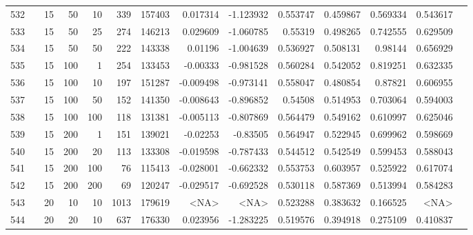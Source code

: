 \begin{longtable}{llrrrrrrrrrrrr}
		532 & &           15 &                50 &           10 &         339 &     157403 &  0.017314 & -1.123932 &  0.553747 &    0.459867 &       0.569334 &  0.543617 \\
		533 & &           15 &                50 &           25 &         274 &     146213 &  0.029609 & -1.060785 &   0.55319 &    0.498265 &       0.742555 &  0.629509 \\
		534 & &           15 &                50 &           50 &         222 &     143338 &   0.01196 & -1.004639 &  0.536927 &    0.508131 &        0.98144 &  0.656929 \\
		535 & &           15 &               100 &            1 &         254 &     133453 &  -0.00333 & -0.981528 &  0.560284 &    0.542052 &       0.819251 &  0.632335 \\
		536 & &           15 &               100 &           10 &         197 &     151287 & -0.009498 & -0.973141 &  0.558047 &    0.480854 &        0.87821 &  0.606955 \\
		537 & &           15 &               100 &           50 &         152 &     141350 & -0.008643 & -0.896852 &   0.54508 &    0.514953 &       0.703064 &  0.594003 \\
		538 & &           15 &               100 &          100 &         118 &     131381 & -0.005113 & -0.807869 &  0.564479 &    0.549162 &       0.610997 &  0.625046 \\
		539 & &           15 &               200 &            1 &         151 &     139021 &  -0.02253 &  -0.83505 &  0.564947 &    0.522945 &       0.699962 &  0.598669 \\
		540 & &           15 &               200 &           20 &         113 &     133308 & -0.019598 & -0.787433 &  0.544512 &    0.542549 &       0.599453 &  0.588043 \\
		541 & &           15 &               200 &          100 &          76 &     115413 & -0.028001 & -0.662332 &  0.553753 &    0.603957 &       0.525922 &  0.617074 \\
		542 & &           15 &               200 &          200 &          69 &     120247 & -0.029517 & -0.692528 &  0.530118 &    0.587369 &       0.513994 &  0.584283 \\
		543 & &           20 &                10 &           10 &           1013 &     179619 &      <NA> &      <NA> &  0.523288 &    0.383632 &       0.166525 &  <NA> \\
		544 & &           20 &                20 &           10 &         637 &     176330 &  0.023956 & -1.283225 &  0.519576 &    0.394918 &       0.275109 &  0.410837 \\

\end{longtable}
